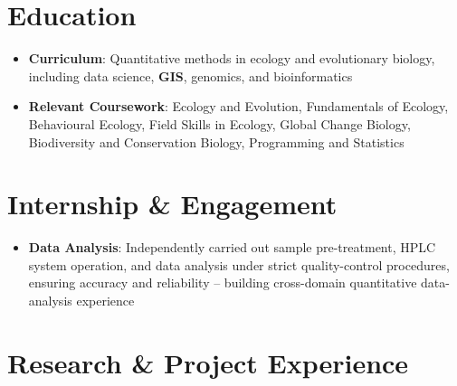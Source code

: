 \documentclass{my-resume}
\begin{document}


\section{Education}
\begin{itemize}[parsep=0.2ex]
  \item \textbf{Curriculum}: Quantitative methods in ecology and evolutionary biology, including data science, \textbf{GIS}, genomics, and bioinformatics
\end{itemize}
\begin{itemize}[parsep=0.2ex]
  \item \textbf{Relevant Coursework}: Ecology and Evolution, Fundamentals of Ecology, Behavioural Ecology, Field Skills in Ecology, Global Change Biology, Biodiversity and Conservation Biology, Programming and Statistics
\end{itemize}

\section{Internship \& Engagement}
\begin{itemize}[parsep=0.2ex]
  \item \textbf{Data Analysis}: Independently carried out sample pre-treatment, HPLC system operation, and data analysis under strict quality-control procedures, ensuring accuracy and reliability -- building cross-domain quantitative data-analysis experience
\end{itemize}

\section{Research \& Project Experience}
\end{document}
